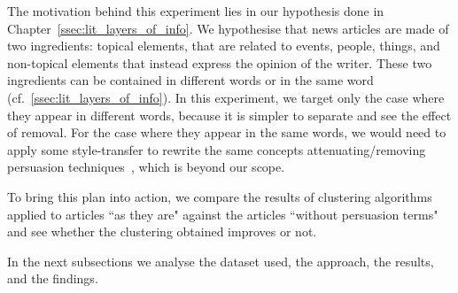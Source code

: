 The motivation behind this experiment lies in our hypothesis done in Chapter~\ref{ssec:lit_layers_of_info}. We hypothesise that news articles are made of two ingredients: topical elements, that are related to events, people, things, and non-topical elements that instead express the opinion of the writer. These two ingredients can be contained in different words or in the same word (cf.~\ref{ssec:lit_layers_of_info}). In this experiment, we target only the case where they appear in different words, because it is simpler to separate and see the effect of removal.
For the case where they appear in the same words, we would need to apply some style-transfer to rewrite the same concepts attenuating/removing persuasion techniques~\citep{bagdasaryan2022spinning}, which is beyond our scope.









To bring this plan into action, we compare the results of  clustering algorithms applied to articles ``as they are" against the articles ``without persuasion terms" and see whether the clustering obtained improves or not.

In the next subsections we analyse the dataset used, the approach, the results, and the findings.



